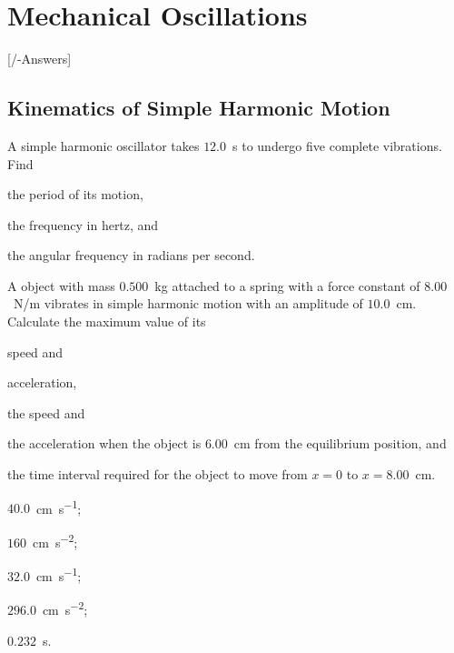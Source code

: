 
\chapter{Mechanical Oscillations}\label{\currfilebase}
[\currfilebase/\currfilebase-Answers]
%

\section{Kinematics of Simple Harmonic Motion}


\begin{problem}
	A simple harmonic oscillator takes $12.0$~s to undergo five
	complete vibrations. Find 
	\begin{enumerate*}[label=(\alph*)]
		\item the period of its motion,
		\item the frequency in hertz, and
		\item the angular frequency in radians per second.
	\end{enumerate*}
\end{problem}

\begin{problem}
	A object with mass $0.500$~kg attached to a spring with a force constant of $8.00$~N/m vibrates in simple harmonic motion with an amplitude of $10.0$~cm. Calculate the maximum value of its 
	\begin{enumerate*}[label=(\alph*)]
		\item speed and
		\item acceleration, 
		\item the speed and
		\item the acceleration when the object is $6.00$~cm from the equilibrium position, and 
		\item the time interval required for the object to move from $x = 0$ to $x = 8.00$~cm.
	\end{enumerate*}
	\begin{solution}
		\begin{enumerate*}[label=(\alph*)]
		\item $40.0$~\si{\centi\meter\per\second}; 
		\item $160$~\si{\centi\meter\per\square\second};
		\item $32.0$~\si{\centi\meter\per\second};
		\item $296.0$~\si{\centi\meter\per\square\second};
		\item $0.232$~s. 
		\end{enumerate*}
	\end{solution}
\end{problem}


